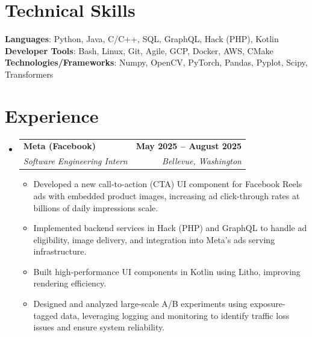 \documentclass[letterpaper,11pt]{article}
\makeatletter
\newcommand{\resumeItem}[1]{
  \item\small{
    {#1 \vspace{-2pt}}
  }
}
\newcommand{\resumeSubheading}[4]{
  \vspace{-2pt}\item
    \begin{tabular*}{1.0\textwidth}[t]{l@{\extracolsep{\fill}}r}
      \textbf{#1} & \textbf{\small #2} \\
      \textit{\small#3} & \textit{\small #4} \\
    \end{tabular*}\vspace{-7pt}
}
\newcommand{\resumeSubHeadingListStart}{\begin{itemize}[leftmargin=0.0in, label={}]}
\newcommand{\resumeSubHeadingListEnd}{\end{itemize}}
\newcommand{\resumeItemListStart}{\begin{itemize}}
\newcommand{\resumeItemListEnd}{\end{itemize}\vspace{-5pt}}
\makeatother
\begin{document}
\section{Technical Skills}
\begin{itemize}[leftmargin=0.15in, label={}]
   \small{\item{
    \textbf{Languages}{: Python, Java, C/C++, SQL, GraphQL, Hack (PHP), Kotlin} \\
    \textbf{Developer Tools}{: Bash, Linux, Git, Agile, GCP, Docker, AWS, CMake} \\
    \textbf{Technologies/Frameworks}{: Numpy, OpenCV, PyTorch, Pandas, Pyplot, Scipy, Transformers} \\
   }}
\end{itemize}
\vspace{-18pt}


%
\section{Experience}
  \resumeSubHeadingListStart
  \resumeSubheading
    {\textbf{Meta (Facebook)}}{May 2025 -- August 2025}
      {Software Engineering Intern}{Bellevue, Washington}
      \resumeItemListStart
      \resumeItem{Developed a new call-to-action (CTA) UI component for Facebook Reels ads with embedded product images, increasing ad click-through rates at billions of daily impressions scale.}
      \resumeItem{Implemented backend services in Hack (PHP) and GraphQL to handle ad eligibility, image delivery, and integration into Meta's ads serving infrastructure.}
      \resumeItem{Built high-performance UI components in Kotlin using Litho, improving rendering efficiency.}
      \resumeItem{Designed and analyzed large-scale A/B experiments using exposure-tagged data, leveraging logging and monitoring to identify traffic loss issues and ensure system reliability.}
      \resumeItemListEnd
  \resumeSubHeadingListEnd
\vspace{-14pt}

\end{document}
